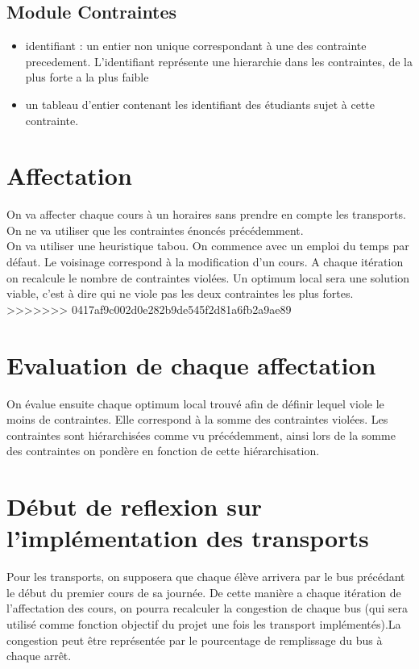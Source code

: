 \documentclass[a4paper,11pt]{article}
\begin{document}
	\subsection{Module Contraintes}                                                           		\begin{itemize}
			\item identifiant : un entier non unique correspondant à une des contrainte precedement. L'identifiant représente une hierarchie dans les contraintes, de la plus forte a la plus faible 
			\item un tableau d'entier contenant les identifiant des étudiants sujet à cette contrainte.
		\end{itemize}
\section{Affectation}
	On va affecter chaque cours à un horaires sans prendre en compte les transports. On ne va utiliser que les contraintes énoncés précédemment. \\
	On va utiliser une heuristique tabou. On commence avec un emploi du temps par défaut. Le voisinage correspond à la modification d'un cours. A chaque itération on recalcule le nombre de contraintes violées. Un optimum local sera une solution viable, c'est à dire qui ne viole pas les deux contraintes les plus fortes. 
>>>>>>> 0417af9c002d0e282b9de545f2d81a6fb2a9ae89
	
\section{Evaluation de chaque affectation}
	On évalue ensuite chaque optimum local trouvé afin de définir lequel viole le moins de contraintes. Elle correspond à la somme des contraintes violées. Les contraintes sont hiérarchisées comme vu précédemment, ainsi lors de la somme des contraintes on pondère en fonction de cette hiérarchisation.
	
\section{Début de reflexion sur l'implémentation des transports}
	Pour les transports, on supposera que chaque élève arrivera par le bus précédant le début du premier cours de sa journée. De cette manière a chaque itération de l'affectation des cours, on pourra recalculer la congestion de chaque bus (qui sera utilisé comme fonction objectif du projet une fois les transport implémentés).La congestion peut être représentée par le pourcentage de remplissage du bus à chaque arrêt. 
\end{document}
